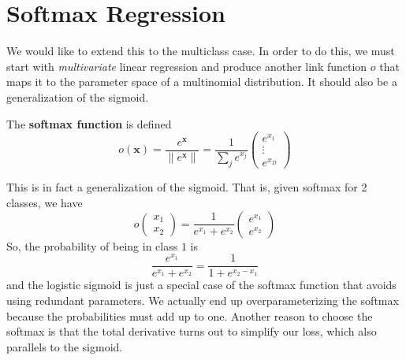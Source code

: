 \section{Softmax Regression}

  We would like to extend this to the multiclass case. In order to do this, we must start with \textit{multivariate} linear regression and produce another link function $o$ that maps it to the parameter space of a multinomial distribution. It should also be a generalization of the sigmoid. 

  \begin{definition}[Softmax]
    The \textbf{softmax function} is defined 
    \begin{equation}
      o(\mathbf{x}) = \frac{e^{\mathbf{x}}}{\|e^{\mathbf{x}}\|} = \frac{1}{\sum_j e^{x_j}}\begin{pmatrix} e^{x_1} \\ \vdots \\ e^{x_D} \end{pmatrix}
    \end{equation}
  \end{definition}

  This is in fact a generalization of the sigmoid. That is, given softmax for 2 classes, we have 
  \begin{equation}
    o\begin{pmatrix} x_1 \\ x_2 \end{pmatrix} = \frac{1}{e^{x_1} + e^{x_2}} \begin{pmatrix} e^{x_1} \\ e^{x_2} \end{pmatrix}
  \end{equation}
  So, the probability of being in class $1$ is 
  \begin{equation}
    \frac{e^{x_1}}{e^{x_1} + e^{x_2}} = \frac{1}{1 + e^{x_2 - x_1}}
  \end{equation}
  and the logistic sigmoid is just a special case of the softmax function that avoids using redundant parameters. We actually end up overparameterizing the softmax because the probabilities must add up to one. Another reason to choose the softmax is that the total derivative turns out to simplify our loss, which also parallels to the sigmoid. 

